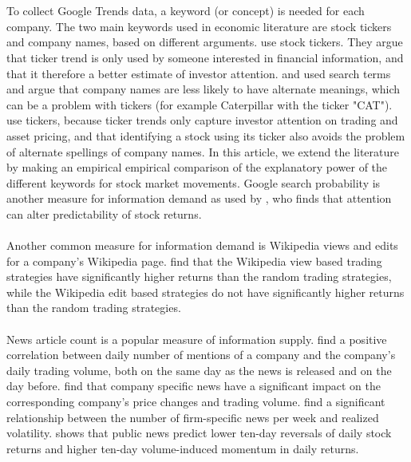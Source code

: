\\\\
To collect Google Trends data, a keyword (or concept) is needed for each company. The two main keywords used in economic literature are stock tickers and company names, based on different arguments. \cite{joseph} use stock tickers. They argue that ticker trend is only used by someone interested in financial information, and that it therefore a better estimate of investor attention. \cite{bijl} and \cite{vlastakis} used search terms and argue that company names are less likely to have alternate meanings, which can be a problem with tickers (for example Caterpillar with the ticker "CAT"). \cite{engelberg} use tickers, because ticker trends only capture investor attention on trading and asset pricing, and that identifying a stock using its ticker also avoids the problem of alternate spellings of company names. In this article, we extend the literature by making an empirical empirical comparison of the explanatory power of the different keywords for stock market movements. Google search probability is another measure for information demand as used by \cite{vozlyublennaia}, who finds that attention can alter predictability of stock returns.       
\\\\
Another common measure for information demand is Wikipedia views and edits for a company's Wikipedia page. \cite{moat} find that the Wikipedia view based trading strategies have significantly higher returns than the random trading strategies, while the Wikipedia edit based strategies do not have significantly higher returns than the random trading strategies. 
\\\\
News article count is a popular measure of information supply. \cite{preis2013} find a positive correlation between daily number of mentions of a company and the company's daily trading volume, both on the same day as the news is released and on the day before. \cite{ryan} find that company specific news have a significant impact on the corresponding company's price changes and trading volume. \cite{vlastakis} find a significant relationship between the number of firm-specific news per week and realized volatility. \cite{tetlock} shows that public news predict lower ten-day reversals of daily stock returns and higher ten-day volume-induced momentum in daily returns.  


